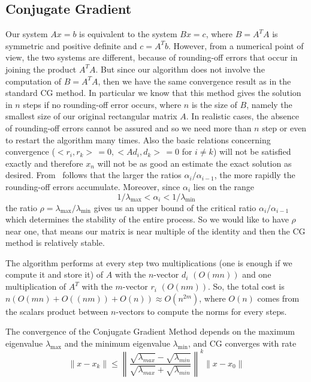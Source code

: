 \documentclass{article}
\begin{document}
\subsection{Conjugate Gradient}\label{subsec:conjugate-gradient}
Our system $Ax = b$ is equivalent to the system $Bx = c$, where $B = A^{T}A$ is symmetric and positive definite and $c = A^{T}b$.
However, from a numerical point of view, the two systems are different, because of rounding-off errors that occur in joining the product $A^{T}A$.
But since our algorithm does not involve the computation of $B = A^{T}A$, then we have the same convergence result as in the standard CG method.
In particular we know that this method gives the solution in $n$ steps if no rounding-off error occurs, where $n$ is the size of $B$, namely the smallest size of our original rectangular matrix $A$.
In realistic cases, the absence of rounding-off errors cannot be assured and so we need more than $n$ step or even to restart the algorithm many times.
Also the basic relations concerning convergence ($<r_i,r_k>\,= 0, <Ad_i,d_k>\,= 0$ for $i \ne k$) will not be satisfied exactly and therefore $x_n$ will not be as good an estimate the exact solution as desired.
From~\cite{hestenes1952methods} follows that the larger the ratios $\alpha_i / \alpha_{i-1}$, the more rapidly the rounding-off errors accumulate.
Moreover, since $\alpha_i$ lies on the range
\[
1 / \lambda_{\max} < \alpha_i < 1 / \lambda_{\min}
\] 
the ratio $\rho = \lambda_{\max}/\lambda_{\min}$ gives us an upper bound of the critical ratio  $\alpha_i / \alpha_{i-1}$ which determines the stability of the entire process.
So we would like to have $\rho$ near one, that means our matrix is near multiple of the identity and then the CG method is relatively stable.

The algorithm performs at every step two multiplications  (one is enough if we compute it and store it) of $A$ with the $n$-vector $d_i$ $(O(mn))$ and one multiplication of $A^{T}$ with the $m$-vector $r_i$ $(O(nm))$.
So, the total cost is $n(O(mn) + O((nm)) + O(n)) \approx O(n^{2m})$, where $O(n)$ comes from the scalars product between $n$-vectors to compute the norms for every steps.

The convergence of the Conjugate Gradient Method depends on the maximum eigenvalue $\lambda_{\max}$ and the minimum eigenvalue $\lambda_{\min}$, and CG converges with rate
\begin{equation}\label{eq:cgconv}
\|x-x_{k}\| \leq \left\lVert\frac{\sqrt{\lambda_{max}}-\sqrt{\lambda_{min}}}{\sqrt{\lambda_{max}}+\sqrt{\lambda_{min}}}\right\rVert^{k}  \|x - x_{0}\| 
\end{equation}
\end{document}
